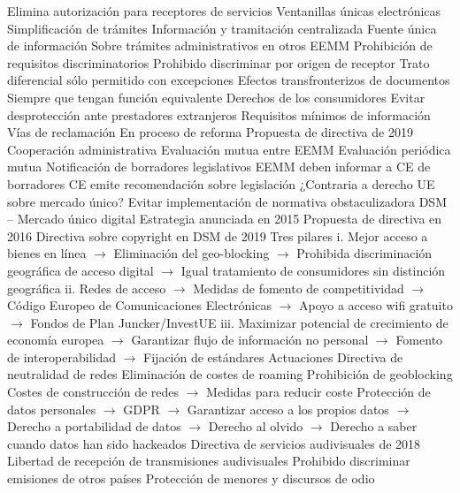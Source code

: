\documentclass{nuevotema}
\begin{document}
\begin{esquemal}
				\4 Elimina autorización para receptores de servicios
			\3 Ventanillas únicas electrónicas
				\4 Simplificación de trámites
				\4 Información y tramitación centralizada
				\4 Fuente única de información
				\4[] Sobre trámites administrativos en otros EEMM
			\3 Prohibición de requisitos discriminatorios
				\4 Prohibido discriminar por origen de receptor
				\4 Trato diferencial sólo permitido con excepciones
			\3 Efectos transfronterizos de documentos
				\4 Siempre que tengan función equivalente
			\3 Derechos de los consumidores
				\4 Evitar desprotección ante prestadores extranjeros
				\4 Requisitos mínimos de información
				\4 Vías de reclamación
				\4 En proceso de reforma
				\4 Propuesta de directiva de 2019
			\3 Cooperación administrativa
			\3 Evaluación mutua entre EEMM
				\4 Evaluación periódica mutua
			\3 Notificación de borradores legislativos
				\4 EEMM deben informar a CE de borradores
				\4 CE emite recomendación sobre legislación
				\4[] ¿Contraria a derecho UE sobre mercado único?
				\4 Evitar implementación de normativa obstaculizadora
			\3 DSM -- Mercado único digital
				\4 Estrategia anunciada en 2015
				\4 Propuesta de directiva en 2016
				\4 Directiva sobre copyright en DSM de 2019
				\4 Tres pilares
				\4[] i. Mejor acceso a bienes en línea
				\4[] $\to$ Eliminación del geo-blocking
				\4[] $\to$ Prohibida discriminación geográfica de acceso digital
				\4[] $\to$ Igual tratamiento de consumidores sin distinción geográfica
				\4[] ii. Redes de acceso
				\4[] $\to$ Medidas de fomento de competitividad
				\4[] $\to$ Código Europeo de Comunicaciones Electrónicas
				\4[] $\to$ Apoyo a acceso wifi gratuito
				\4[] $\to$ Fondos de Plan Juncker/InvestUE
				\4[] iii. Maximizar potencial de crecimiento de economía europea
				\4[] $\to$ Garantizar flujo de información no personal
				\4[] $\to$ Fomento de interoperabilidad
				\4[] $\to$ Fijación de estándares
				\4 Actuaciones
				\4[] Directiva de neutralidad de redes
				\4[] Eliminación de costes de roaming
				\4[] Prohibición de geoblocking
				\4[] Costes de construcción de redes
				\4[] $\to$ Medidas para reducir coste
				\4[] Protección de datos personales
				\4[] $\to$ GDPR
				\4[] $\to$ Garantizar acceso a los propios datos
				\4[] $\to$ Derecho a portabilidad de datos
				\4[] $\to$ Derecho al olvido
				\4[] $\to$ Derecho a saber cuando datos han sido hackeados
			\3 Directiva de servicios audivisuales de 2018
				\4 Libertad de recepción de transmisiones audivisuales
				\4[] Prohibido discriminar emisiones de otros países
				\4 Protección de menores y discursos de odio

\end{esquemal}
\end{document}

